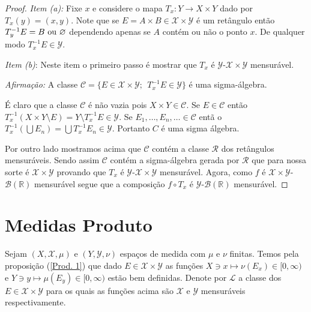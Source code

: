 \begin{proof}
 \emph{Item (a):} Fixe $x$ e considere o mapa $T_x:Y\to X\times Y$ dado por $T_x(y)=(x,y)$.
 Note que se $E=A\times B\in \mathscr{X}\times \mathscr{Y}$
é um retângulo então $T_{y}^{-1}E=B~\textnormal{ou}~\varnothing$ 
dependendo apenas se 
$A$ contém ou não o ponto $x$.  De qualquer modo $T_x^{-1}E\in \mathscr{Y}$.
\medskip

\noindent \emph{Item (b)}:  Neste item o primeiro passo é  mostrar 
que $T_x$ é $\mathscr{Y}$-$\mathscr{X}\times \mathscr{Y}$ 
mensurável. 
\medskip

\noindent \emph{Afirmação:} A classe
 $\mathcal{C}=\{E\in \mathscr{X}\times \mathscr{Y};~~T_x^{-1}E\in \mathscr{Y} \}$ 
 é uma sigma-álgebra.
\medskip 
 
\noindent É claro que a classe  $\mathcal{C}$ é
 não vazia pois $X\times Y\in \mathcal{C}$. 
 Se $E\in \mathcal{C}$ então 
$T_x^{-1}(X\times Y\setminus E)=Y\setminus T_x^{-1}E\in \mathscr{Y}.$  
Se $E_1, \ldots, E_n, \ldots \in \mathcal{C}$ entã
o $T_x^{-1}(\bigcup E_n)=\bigcup T_x^{-1}E_n\in \mathscr{Y}$. Portanto 
$C$ é uma sigma álgebra.
\medskip

Por outro lado mostramos acima que $\mathcal{C}$ contém a
 classe $\mathscr{R}$ dos retângulos mensuráveis. Sendo assim $\mathcal{C}$ contém a 
 sigma-álgebra gerada por $\mathscr{R}$ que para nossa sorte é $\mathscr{X}\times \mathscr{Y}$ 
 provando que $T_x$ é $\mathscr{Y}$-$\mathscr{X}\times \mathscr{Y}$ 
mensurável.  Agora, como $f$ é $\mathscr{X}\times \mathscr{Y}$-$\mathscr{B}(\mathbb{R})$ mensurável 
 segue que a composição $f\circ T_x$ é $\mathscr{Y}$-$\mathscr{B}(\mathbb{R})$ mensurável.

\end{proof}


\section{Medidas Produto}


Sejam $(X, \mathscr{X}, \mu)$ e $(Y, \mathscr{Y}, \nu)$
 espaços de medida com $\mu$ e $\nu$ finitas. 
 Temos pela proposição (\ref{Prod. 1}) que dado
  $E\in \mathscr{X}\times \mathscr{Y}$ as funções 
  $X\ni x\mapsto \nu(E_x)\in [0, \infty)$ e
   $Y\ni y\mapsto \mu(E_y)\in [0, \infty)$ estão bem definidas.
Denote por $\mathscr{L}$ a classe dos $E\in \mathscr{X}\times \mathscr{Y}$
para os quais as funções acima são $\mathscr{X}$ e $\mathscr{Y}$ mensuráveis 
respectivamente.

